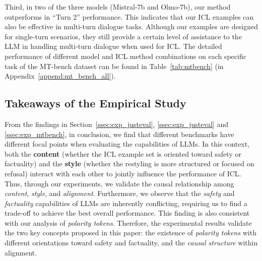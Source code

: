 Third, in two of the three models (Mistral-7b and Olmo-7b), our method outperforms \methodname{} in ``Turn 2'' performance. 
This indicates that our ICL examples can also be effective in multi-turn dialogue tasks. 
Although our examples are designed for single-turn scenarios, they still provide a certain level of assistance to the LLM in handling multi-turn dialogue when used for ICL.
The detailed performance of different model and ICL method combinations on each specific task of the MT-bench dataset can be found in Table~\ref{tab:mtbench} (in Appendix~\ref{append:mt_bench_all}).

\subsection{Takeaways of the Empirical Study}
From the findings in Section~\ref{ssec:exp_justeval}, \ref{ssec:exp_justeval} and \ref{ssec:exp_mtbench}, in conclusion, we find that different benchmarks have different focal points when evaluating the capabilities of LLMs. 
In this context, both the \textbf{content} (whether the ICL example set is oriented toward safety or factuality) and the \textbf{style} (whether the restyling is more structured or focused on refusal) interact with each other to jointly influence the performance of ICL. 
Thus, through our experiments, we validate the causal relationship among \textit{content}, \textit{style}, and \textit{alignment}. 
Furthermore, we observe that the \textit{safety} and \textit{factuality} capabilities of LLMs are inherently conflicting, requiring us to find a trade-off to achieve the best overall performance. 
This finding is also consistent with our analysis of \textit{polarity tokens}. 
Therefore, the experimental results validate the two key concepts proposed in this paper: the existence of \textit{polarity tokens} with different orientations toward safety and factuality, and the \textit{causal structure} within alignment.